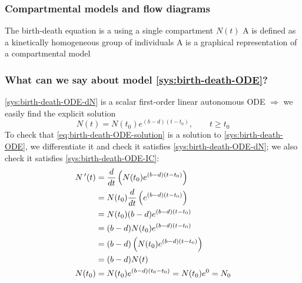 \documentclass[aspectratio=169]{beamer}
\begin{document}
\begin{frame}\frametitle{Compartmental models and flow diagrams}
The birth-death equation is a  using a single compartment $N(t)$
\vfill
A  is defined as a kinetically homogeneous group of individuals
\vfill
A  is a graphical representation of a compartmental model
\begin{center}
\end{center}
\end{frame}

\begin{frame}\frametitle{What can we say about model \eqref{sys:birth-death-ODE}?}
\eqref{sys:birth-death-ODE-dN} is a scalar first-order linear autonomous ODE
$\Rightarrow$
we easily find the explicit solution
\begin{equation}
\label{eq:birth-death-ODE-solution}
N(t)=N(t_0)e^{(b-d)(t-t_0)},\qquad t\geq t_0
\end{equation}
\vfill
To check that \eqref{eq:birth-death-ODE-solution} is a solution to \eqref{sys:birth-death-ODE}, we differentiate it and check it satisfies \eqref{sys:birth-death-ODE-dN}; we also check it satisfies \eqref{sys:birth-death-ODE-IC}:
\begin{align*}
N\,'(t) &= \frac{d}{dt}\left(N(t_0)e^{(b-d)(t-t_0)}\right) \\
&= N(t_0) \frac{d}{dt}\left(e^{(b-d)(t-t_0)}\right) \\
&= N(t_0)(b-d)e^{(b-d)(t-t_0)} \\
&= (b-d)N(t_0)e^{(b-d)(t-t_0)} \\
&= (b-d)\left(N(t_0)e^{(b-d)(t-t_0)}\right) \\
&= (b-d)N(t) \\
N(t_0) &= N(t_0)e^{(b-d)(t_0-t_0)} = N(t_0)e^0 = N_0
\end{align*}
\end{frame}
\end{document}
